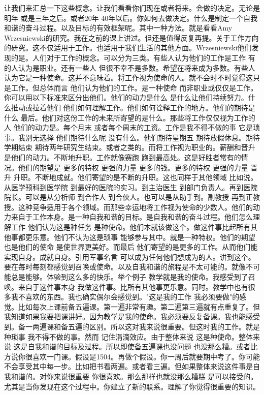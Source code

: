让我们来汇总一下这些概念。让我们看看你们现在或者将来。会做的决定。无论是明年 或是三年之后。或者20年 40年以后。你如何去做决定。什么是制定一个自我和谐的奋斗过程。以及目标的有效框架呢。其中一种方法。就是看看Amy Wrzesniewski的研究。我在之前的课上讲过。但还是值得反复再提。关于工作方向的研究。这不仅适用于工作。也适用于我们生活的其他方面。Wrzesniewski他们发现的是。人们对于工作的概念。可以分为三类。有些人认为他们的工作是工作 有的人认为是职业。还有一些人 但很不幸不是多数。希望在将来成为多数。有些人认为它是一种使命。这并不意味着。将工作视为使命的人。就不会时不时觉得这只是工作。但总体而言 他们认为他们的工作。是一种使命 而非职业或仅仅是工作。你可以用以下标准来区分出他们。他们的动力是什么 是什么让他们持续努力。什么推动或拉着他们 他们如何理解工作。他们如何诠释工作的地方。他们的期待是什么 最后。他们对这份工作的未来所寄望的是什么。那些将工作仅仅视为工作的人 他们的动力是。每个月末 或者每个周末的工资。工作是我不得不做的事 它是琐事。我别无选择 他们期待什么呢 没有什么。他们期待星期五 期待放假休息。期待学期结束 期待两年研究生结束。或者之类的。而将工作视为职业的。薪酬和晋升是他们的动力。不断地升职。工作就像赛跑 跑到最高处。这是好胜者常有的情况。他们的期望是 更多的特权 更强的力量 更多的钱。更多的特权 更强的力量 晋升 升职。不断地成就。他们寄望的是不断的升职。这也同样于其他领域 比如说。从医学预科到医学院 到最好的医院的实习。到主治医生 到部门负责人。再到医院院长。可以是从分析师 到合作人 到合伙人。也可以是从助手到。副教授 再到正教授。这种竞争适用于各个领域。而那些幸运地将工作视为使命的少数人。他们的动力来自于工作本身。是一种自我和谐的目标。是自我和谐的奋斗过程。他们怎么理解工作 他们认为这是种任务 是种使命。他们本就该做这个。做这件事比起所有其他事都更乐意。他们不认为这是琐事 能够参与其中。就是一种特权。他们的期望 也是他们的使命 是使世界更美好。而最后 他们寄望的是更多的工作。从而他们能实现自身。成就自身。引用军事名言 可以成为任何他们想成为的人。讲到这个。要在每时每刻都感觉到召唤或使命。以及自我和谐的旅程是不太可能的。就像不可能总是能够。体验到这么多的快乐。举个例子 教学就是我的使命。我感受到了召唤。来自于这件事本身 我做这件事。比所有其他事更乐意。同时。教学中也有很多我不喜欢的东西。我也确实偶尔会感觉到。"这是我的工作 我必须要做"的感觉。比如每次上课前备五遍课。第一遍非常有趣。第二遍第三遍就有点重复了。但我知道如果我要把课讲好。因为教学是我的使命。我必须要反复备课。我也能感受到。备一两遍课和备五遍的区别。所以这对我来说很重要。但这时我的工作。就是种琐事 我不得不做的事。然而 记住涓滴效应。由于整体来说 这是种使命。整体来说 这是自我和谐的目标及过程。所以即使备五遍课也没问题 也没那么糟。或者比方说你很喜欢一门课。假设是1504。再做个假设。你一周后就要期中考了。你可能不会享受其中每一步。比如把书看两遍。或者看三遍。但如果整体来说这件事是自我和谐的。对你来说很重要 你很喜欢。那么那样也就没那么糟糕 是可以接受的。尤其是当你发现在这个过程中。你建立了新的联系。理解了你觉得很重要的知识。 

